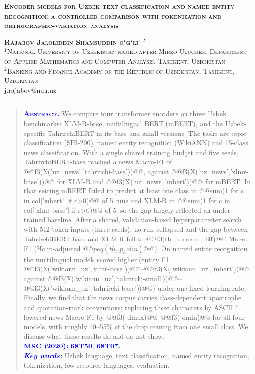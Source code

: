 \documentclass[11pt]{book}
\begin{document}
\sloppy

\renewcommand{\thefootnote}{}
\begin{center}
\textsc{\textbf{Encoder models for Uzbek text classification and named entity recognition: a controlled comparison with tokenization and orthographic-variation analysis}}\\
\medskip

\textsc{\textbf{Rajabov Jaloliddin Shamsuddin o‘g‘li$^{1,2}$}}\\
$^{1}$\textsc{National University of Uzbekistan named after Mirzo Ulugbek, Department of Applied Mathematics and Computer Analysis, Tashkent, Uzbekistan}\\
$^{2}$\textsc{Banking and Finance Academy of the Republic of Uzbekistan, Tashkent, Uzbekistan}\\
{j.rajabov@nuu.uz}\\
\end{center}

\noindent\rule{\linewidth}{1.0 pt}

\begin{quote}
\textsc{\textcolor{blue}{\textbf{Abstract.}}}
We compare four transformer encoders on three Uzbek benchmarks: XLM-R-base, multilingual BERT (mBERT), and the Uzbek-specific TahrirchiBERT in its base and small versions. The tasks are topic classification (SIB-200), named entity recognition (WikiANN) and 15-class news classification. With a single shared training budget and five seeds, TahrirchiBERT-base reached a news Macro-F1 of @@f3(X('uz_news','tahrirchi-base'))@@, against @@f3(X('uz_news','xlmr-base'))@@ for XLM-R and @@f3(X('uz_news','mbert'))@@ for mBERT. In that setting mBERT failed to predict at least one class in @@sum(1 for c in col['mbert'] if c>0)@@ of 5 runs and XLM-R in @@sum(1 for c in col['xlmr-base'] if c>0)@@ of 5, so the gap largely reflected an under-trained baseline. After a shared, validation-based hyperparameter search with 512-token inputs (three seeds), no run collapsed and the gap between TahrirchiBERT-base and XLM-R fell to @@f3(tb_x.mean_diff)@@ Macro-F1 (Holm-adjusted $@@peq(tb_x.p_holm)@@$). On named entity recognition the multilingual models scored higher (entity F1 @@f3(X('wikiann_uz','xlmr-base'))@@--@@f3(X('wikiann_uz','mbert'))@@ against @@f3(X('wikiann_uz','tahrirchi-small'))@@--@@f3(X('wikiann_uz','tahrirchi-base'))@@) under one fixed learning rate. Finally, we find that the news corpus carries class-dependent apostrophe and quotation-mark conventions; replacing these characters by ASCII \texttt{'} lowered news Macro-F1 by @@f3(-dmax)@@--@@f3(-dmin)@@ for all four models, with roughly 40--55\% of the drop coming from one small class. We discuss what these results do and do not show.
\\ [6pt]
\textcolor{blue}{\textbf{MSC (2020): {68T50; 68T07}.}}
\\ [6pt]
\textit{\textcolor{blue}{\textbf{Key words:}}} Uzbek language, text classification, named entity recognition, tokenization, low-resource languages, evaluation.
\end{quote}
\end{document}
